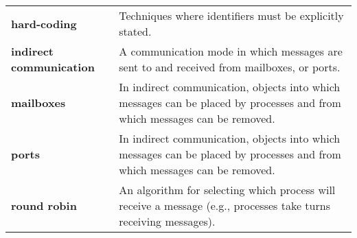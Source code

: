 \begin{tabular}{>{\raggedright}p{} >{\raggedright\arraybackslash}p{}}
\textbf{hard-coding} & Techniques where identifiers must be explicitly stated. \\
\textbf{indirect communication} & A communication mode in which messages are sent to and received from mailboxes, or ports. \\
\textbf{mailboxes} & In indirect communication, objects into which messages can be placed by processes and from which messages can be removed. \\
\textbf{ports} & In indirect communication, objects into which messages can be placed by processes and from which messages can be removed. \\
\textbf{round robin} & An algorithm for selecting which process will receive a message (e.g., processes take turns receiving messages). \\
\bottomrule
\end{tabular}
\vspace{\baselineskip}
